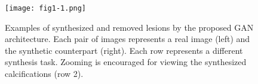 \documentclass{article}
\begin{document}



\begin{figure}[t!]
\texttt{[image: fig1-1.png]}
\caption{Examples of synthesized and removed lesions by the proposed GAN architecture. %
Each pair of images represents a real image (left) and the synthetic counterpart (right). Each row represents a different synthesis task. Zooming is encouraged for viewing the synthesized calcifications (row 2).} \label{syn-ex}
\end{figure}
\end{document}
